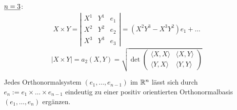 \begin{bsp}{\(\uline{n=3}\):}
  \begin{align*}
   X \times Y = \left\vert \begin{matrix}
                            X^1 & Y^1 & e_1 \\
                            X^2 & Y^2 & e_2 \\
                            X^3 & Y^3 & e_3
                           \end{matrix}
		\right\vert
		=(X^2Y^3-X^3Y^2) e_1 + \dots
  \end{align*}
\[
 |X \times Y| = a_2(X,Y) = \sqrt{\det \begin{pmatrix}
                                      \langle X,X\rangle & \langle X,Y\rangle \\
                                      \langle Y,X \rangle & \langle Y,Y\rangle
                                     \end{pmatrix}
}
\]
\end{bsp}

\begin{anwendung} 
Jedes Orthonormalsystem \((e_1, \dots, e_{n-1})\) im \(\mathbb{R}^n\) lässt sich durch \(e_n := e_1 \times \dots \times e_{n-1}\) eindeutig zu einer positiv orientierten Orthonormalbasis \((e_1, \dots, e_n)\) ergänzen.
\end{anwendung}
